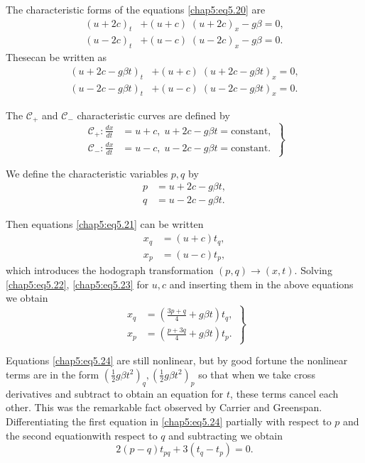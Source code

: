 The characteristic forms of the equations \eqref{chap5:eq5.20} are 
\begin{align*}
(u+2c)_t &+ (u+c)\;(u+2c)_x -g\beta =0,\\
(u-2c)_t &+ (u-c)\;(u-2c)_x -g\beta =0.
\end{align*}
 These\pageoriginale can be written as
\begin{align*}
(u+2c-g\beta t)_t &+ (u+c)\;(u+2c-g\beta t)_x=0,\\
(u-2c-g\beta t)_t &+ (u-c)\;(u-2c-g\beta t)_x=0.
\end{align*}

The $\mathscr{C}_+$ and $\mathscr{C}_-$ characteristic curves are defined by 
\begin{equation}
\left.
\begin{aligned}
\mathscr{C}_+:\frac{dx}{dt} &= u+c, \; u+2c-g\beta t=\text{constant},\\
\mathscr{C}_-:\frac{dx}{dt} &= u-c, \; u-2c-g\beta t=\text{constant}.
\end{aligned}
\right\}\tag{5.21}\label{chap5:eq5.21}
\end{equation}

We define the characteristic variables $p,q$ by 
\begin{align}
p &= u+2c-g\beta t,\tag{5.22}\label{chap5:eq5.22}\\
q &= u-2c-g\beta t.\tag{5.23}\label{chap5:eq5.23}
\end{align}

Then equations \eqref{chap5:eq5.21} can be written 
\begin{align*}
x_q &= (u+c)t_q,\\
x_p &= (u-c)t_p,
\end{align*}
which introduces the hodograph transformation $(p,q)\to(x,t)$. Solving \eqref{chap5:eq5.22}, \eqref{chap5:eq5.23} for $u,c$ and inserting them in the above equations we obtain
\begin{equation}
\left.
\begin{aligned}
x_q &= \left(\frac{3p+q}{4}+g\beta t\right)t_q,\\
x_p &= \left(\frac{p+3q}{4}+g\beta t\right)t_p.
\end{aligned}
\right\}\tag{5.24}\label{chap5:eq5.24}
\end{equation}

Equations \eqref{chap5:eq5.24} are still nonlinear, but by good fortune the nonlinear terms are in the form $(\frac{1}{2}g\beta t^2)_q, (\frac{1}{2}g\beta t^2)_p$ so that when we take cross derivatives and subtract to obtain an equation for $t$, these terms cancel each other. This was the remarkable fact observed by Carrier and Greenspan. Differentiating the first equation in \eqref{chap5:eq5.24} partially with respect to $p$ and the second equation\pageoriginale with respect to $q$ and subtracting we obtain
\begin{equation}
2(p-q)t_{pq}+3\left(t_q-t_p\right)=0.\tag{5.25}\label{chap5:eq5.25}
\end{equation}

